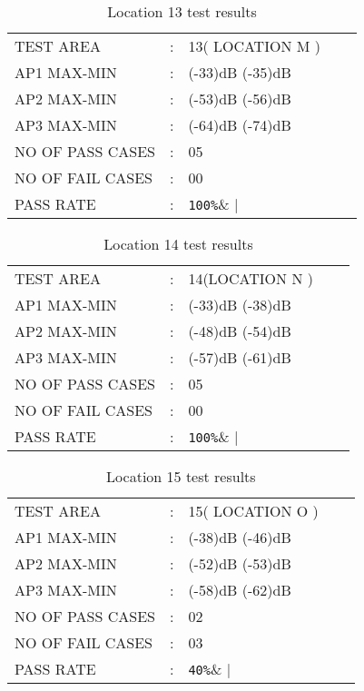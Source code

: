 \documentclass{report}
\begin{document}
	\begin{table}[H]
		\centering
		\label{LOCATION THIRTEEN TEST}
		\begin{tabular}{lllll}
			TEST AREA& :&  13( LOCATION M )&    \\
			AP1 MAX-MIN& :& (-33)dB (-35)dB&  \\
			AP2 MAX-MIN& :& (-53)dB (-56)dB&   \\
			AP3 MAX-MIN& :& (-64)dB (-74)dB&   \\
			NO OF PASS CASES& :& 05&  \\
			NO OF FAIL CASES& :& 00&   \\
			PASS RATE& :& \verb|100%|&   
		\end{tabular}
		\caption{Location 13 test results}
	\end{table}
	
	
	\begin{table}[H]
		\centering
		\label{LOCATION FOURTEEN TEST}
		\begin{tabular}{lllll}
			TEST AREA& :&  14(LOCATION N )&    \\
			AP1 MAX-MIN& :& (-33)dB (-38)dB&  \\
			AP2 MAX-MIN& :& (-48)dB (-54)dB&   \\
			AP3 MAX-MIN& :& (-57)dB (-61)dB&   \\
			NO OF PASS CASES& :& 05&  \\
			NO OF FAIL CASES& :& 00&   \\
			PASS RATE& :& \verb|100%|&   
		\end{tabular}
		\caption{Location 14 test results}
	\end{table}
	
	
	\begin{table}[H]
		\centering
		\label{LOCATION FIFTEEN TEST}
		\begin{tabular}{lllll}
			TEST AREA& :&  15( LOCATION O )&    \\
			AP1 MAX-MIN& :& (-38)dB (-46)dB&  \\
			AP2 MAX-MIN& :& (-52)dB (-53)dB&   \\
			AP3 MAX-MIN& :& (-58)dB (-62)dB&   \\
			NO OF PASS CASES& :& 02&  \\
			NO OF FAIL CASES& :& 03&   \\
			PASS RATE& :& \verb|40%|&   
		\end{tabular}
		\caption{Location 15 test results}
	\end{table}
	
\end{document}
